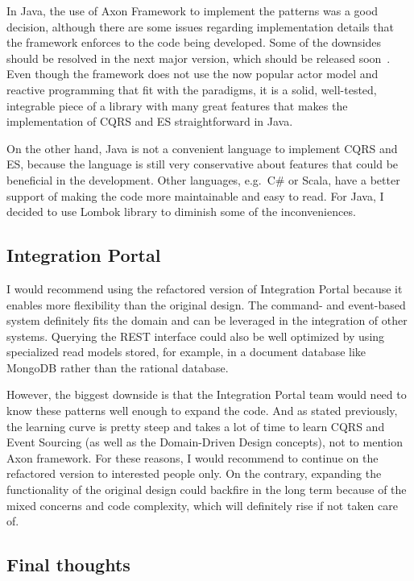\documentclass{book}
\begin{document}
In Java, the use of Axon Framework to implement the patterns was a good
decision, although there are some issues regarding implementation
details that the framework enforces to the code being developed. Some of
the downsides should be resolved in the next major version, which should
be released soon~\cite{axon}. Even though the framework does not use the
now popular actor model and reactive programming that fit with the
paradigms, it is a solid, well-tested, integrable piece of a library
with many great features that makes the implementation of CQRS and ES
straightforward in Java.

On the other hand, Java is not a convenient language to implement CQRS
and ES, because the language is still very conservative about features
that could be beneficial in the development. Other languages, e.g.~C\#
or Scala, have a better support of making the code more maintainable and
easy to read. For Java, I decided to use Lombok library to diminish some
of the inconveniences.

\subsection{Integration Portal}\label{integration-portal}

I would recommend using the refactored version of Integration Portal
because it enables more flexibility than the original design. The
command- and event-based system definitely fits the domain and can be
leveraged in the integration of other systems. Querying the REST
interface could also be well optimized by using specialized read models
stored, for example, in a document database like MongoDB rather than the
rational database.

However, the biggest downside is that the Integration Portal team would
need to know these patterns well enough to expand the code. And as
stated previously, the learning curve is pretty steep and takes a lot of
time to learn CQRS and Event Sourcing (as well as the Domain-Driven
Design concepts), not to mention Axon framework. For these reasons, I
would recommend to continue on the refactored version to interested
people only. On the contrary, expanding the functionality of the
original design could backfire in the long term because of the mixed
concerns and code complexity, which will definitely rise if not taken
care of.

\subsection{Final thoughts}\label{final-thoughts}
\end{document}

